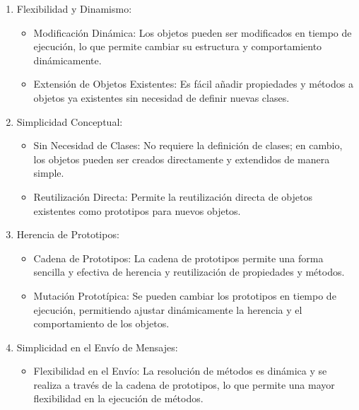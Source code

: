 \documentclass{article}
\begin{document}
\begin{enumerate}
      \item Flexibilidad y Dinamismo:
            \begin{itemize}
                  \item Modificación Dinámica: Los objetos pueden ser modificados en tiempo de ejecución, lo que permite
                        cambiar su estructura y comportamiento dinámicamente.
                  \item Extensión de Objetos Existentes: Es fácil añadir propiedades y métodos a objetos ya existentes sin
                        necesidad de definir nuevas clases.
            \end{itemize}
      \item Simplicidad Conceptual:
            \begin{itemize}
                  \item Sin Necesidad de Clases: No requiere la definición de clases; en cambio, los objetos pueden ser
                        creados directamente y extendidos de manera simple.
                  \item Reutilización Directa: Permite la reutilización directa de objetos existentes como prototipos
                        para nuevos objetos.
            \end{itemize}
      \item Herencia de Prototipos:
            \begin{itemize}
                  \item Cadena de Prototipos: La cadena de prototipos permite una forma sencilla y efectiva de herencia y
                        reutilización de propiedades y métodos.
                  \item Mutación Prototípica: Se pueden cambiar los prototipos en tiempo de ejecución, permitiendo ajustar
                        dinámicamente la herencia y el comportamiento de los objetos.
            \end{itemize}
      \item Simplicidad en el Envío de Mensajes:
            \begin{itemize}
                  \item Flexibilidad en el Envío: La resolución de métodos es dinámica y se realiza a través de la cadena
                        de prototipos, lo que permite una mayor flexibilidad en la ejecución de métodos.
            \end{itemize}
\end{enumerate}
\end{document}
